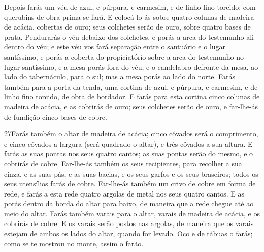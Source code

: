 Depois farás um véu de azul, e púrpura, e carmesim, e de linho
fino torcido; com querubins de obra prima se fará. E
colocá-lo-ás sobre quatro colunas de madeira de acácia, cobertas de
ouro; seus colchetes serão de ouro, sobre quatro bases de prata.
Pendurarás o véu debaixo dos colchetes, e porás a arca do
testemunho ali dentro do véu; e este véu vos fará separação entre o
santuário e o lugar santíssimo, e porás a coberta do
propiciatório sobre a arca do testemunho no lugar santíssimo,
e a mesa porás fora do véu, e o candelabro defronte da mesa,
ao lado do tabernáculo, para o sul; mas a mesa porás ao lado do
norte. Farás também para a porta da tenda, uma cortina de
azul, e púrpura, e carmesim, e de linho fino torcido, de obra de
bordador. E farás para esta cortina cinco colunas de madeira
de acácia, e as cobrirás de ouro; seus colchetes serão de ouro, e
far-lhe-ás de fundição cinco bases de cobre.

\medskip

\lettrine{27} Farás também o altar de madeira de acácia; cinco
côvados será o comprimento, e cinco côvados a largura (será quadrado
o altar), e três côvados a sua altura. E farás as suas pontas
nos seus quatro cantos; as suas pontas serão do mesmo, e o cobrirás
de cobre. Far-lhe-ás também os seus recipientes, para recolher a
sua cinza, e as suas pás, e as suas bacias, e os seus garfos e os
seus braseiros; todos os seus utensílios farás de cobre.
Far-lhe-ás também um crivo de cobre em forma de rede, e farás a
esta rede quatro argolas de metal nos seus quatro cantos. E as
porás dentro da borda do altar para baixo, de maneira que a rede
chegue até ao meio do altar. Farás também varais para o altar,
varais de madeira de acácia, e os cobrirás de cobre. E os varais
serão postos nas argolas, de maneira que os varais estejam de ambos
os lados do altar, quando for levado. Oco e de tábuas o farás;
como se te mostrou no monte, assim o farão.

